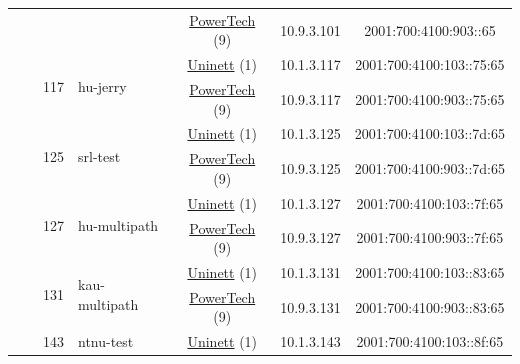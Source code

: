 \begin{small}
\begin{center}
\begin{longtable}{|c|c|c|c|c|c|c|c|}
  &  & \multicolumn{2}{|c|}{} & \multicolumn{2}{|c|}{\tiny{\href{http://www.powertech.no}{PowerTech} (9)}} & \tiny{10.9.3.101} & \tiny{2001:700:4100:903::65} \\* \cline{3-3}\cline{4-4}\cline{5-5}\cline{6-6}\cline{7-7}\cline{8-8}
  &  & \multirow{2}{*}{\tiny{117}} & \multicolumn{1}{|l|}{\multirow{2}{*}{\tiny{hu-jerry}}} & \multicolumn{2}{|c|}{\tiny{\href{https://www.uninett.no}{Uninett} (1)}} & \tiny{10.1.3.117} & \tiny{2001:700:4100:103::75:65} \\* \cline{5-5}\cline{6-6}\cline{7-7}\cline{8-8}
  &  &  &  & \multicolumn{2}{|c|}{\tiny{\href{http://www.powertech.no}{PowerTech} (9)}} & \tiny{10.9.3.117} & \tiny{2001:700:4100:903::75:65} \\* \cline{3-3}\cline{4-4}\cline{5-5}\cline{6-6}\cline{7-7}\cline{8-8}
  &  & \multirow{2}{*}{\tiny{125}} & \multicolumn{1}{|l|}{\multirow{2}{*}{\tiny{srl-test}}} & \multicolumn{2}{|c|}{\tiny{\href{https://www.uninett.no}{Uninett} (1)}} & \tiny{10.1.3.125} & \tiny{2001:700:4100:103::7d:65} \\* \cline{5-5}\cline{6-6}\cline{7-7}\cline{8-8}
  &  &  &  & \multicolumn{2}{|c|}{\tiny{\href{http://www.powertech.no}{PowerTech} (9)}} & \tiny{10.9.3.125} & \tiny{2001:700:4100:903::7d:65} \\* \cline{3-3}\cline{4-4}\cline{5-5}\cline{6-6}\cline{7-7}\cline{8-8}
  &  & \multirow{2}{*}{\tiny{127}} & \multicolumn{1}{|l|}{\multirow{2}{*}{\tiny{hu-multipath}}} & \multicolumn{2}{|c|}{\tiny{\href{https://www.uninett.no}{Uninett} (1)}} & \tiny{10.1.3.127} & \tiny{2001:700:4100:103::7f:65} \\* \cline{5-5}\cline{6-6}\cline{7-7}\cline{8-8}
  &  &  &  & \multicolumn{2}{|c|}{\tiny{\href{http://www.powertech.no}{PowerTech} (9)}} & \tiny{10.9.3.127} & \tiny{2001:700:4100:903::7f:65} \\* \cline{3-3}\cline{4-4}\cline{5-5}\cline{6-6}\cline{7-7}\cline{8-8}
  &  & \multirow{2}{*}{\tiny{131}} & \multicolumn{1}{|l|}{\multirow{2}{*}{\tiny{kau-multipath}}} & \multicolumn{2}{|c|}{\tiny{\href{https://www.uninett.no}{Uninett} (1)}} & \tiny{10.1.3.131} & \tiny{2001:700:4100:103::83:65} \\* \cline{5-5}\cline{6-6}\cline{7-7}\cline{8-8}
  &  &  &  & \multicolumn{2}{|c|}{\tiny{\href{http://www.powertech.no}{PowerTech} (9)}} & \tiny{10.9.3.131} & \tiny{2001:700:4100:903::83:65} \\* \cline{3-3}\cline{4-4}\cline{5-5}\cline{6-6}\cline{7-7}\cline{8-8}
  &  & \multirow{2}{*}{\tiny{143}} & \multicolumn{1}{|l|}{\multirow{2}{*}{\tiny{ntnu-test}}} & \multicolumn{2}{|c|}{\tiny{\href{https://www.uninett.no}{Uninett} (1)}} & \tiny{10.1.3.143} & \tiny{2001:700:4100:103::8f:65} \\* \cline{5-5}\cline{6-6}\cline{7-7}\cline{8-8}

\end{longtable}
\end{center}
\end{small}
